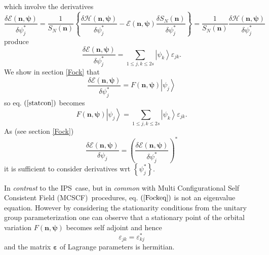 \documentclass[aps,preprint]{revtex4}%
\begin{document}
which involve the derivatives
\begin{equation}
\frac{\delta\mathcal{E}\left(  \mathbf{n,\psi}\right)  }{\delta\psi_{j}^{\ast
}}=\frac{1}{S_{N}\left(  \mathbf{n}\right)  }\left\{  \frac{\delta
\mathcal{H}\left(  \mathbf{n,\psi}\right)  }{\delta\psi_{j}^{\ast}%
}-\mathcal{E}\left(  \mathbf{n,\psi}\right)  \frac{\delta S_{N}\left(
\mathbf{n}\right)  }{\delta\psi_{j}^{\ast}}\right\}  =\frac{1}{S_{N}\left(
\mathbf{n}\right)  }\frac{\delta\mathcal{H}\left(  \mathbf{n,\psi}\right)
}{\delta\psi_{j}^{\ast}}%
\end{equation}
produce
\begin{equation}
\frac{\delta\mathcal{E}\left(  \mathbf{n,\psi}\right)  }{\delta\psi_{j}^{\ast
}}=\sum_{1\leq j,k\leq2s}\left\vert \psi_{k}\right\rangle \varepsilon_{jk}.
\label{statcon}%
\end{equation}
We show in section \ref{Fock} that
\begin{equation}
\frac{\delta\mathcal{E}\left(  \mathbf{n,\psi}\right)  }{\delta\psi_{j}^{\ast
}}=F\left(  \mathbf{n,\psi}\right)  \left\vert \psi_{j}\right\rangle
\end{equation}
so eq. $\left(  \ref{statcon}\right)  $ becomes
\begin{equation}
F\left(  \mathbf{n,\psi}\right)  \left\vert \psi_{j}\right\rangle =\sum_{1\leq
j,k\leq2s}\left\vert \psi_{k}\right\rangle \varepsilon_{jk}. \label{Fockeq}%
\end{equation}
As (see section \ref{Fock})%
\begin{equation}
\frac{\delta\mathcal{E}\left(  \mathbf{n,\psi}\right)  }{\delta\psi_{j}%
}=\left(  \frac{\delta\mathcal{E}\left(  \mathbf{n,\psi}\right)  }{\delta
\psi_{j}^{\ast}}\right)  ^{\ast}%
\end{equation}
it is sufficient to consider derivatives wrt $\left\{  \psi_{j}^{\ast
}\right\}  $.

In \emph{contrast} to the IPS\ case, but in \emph{common} with Multi
Configurational Self Consistent Field (MCSCF)\ procedures, eq. $\left(
\ref{Fockeq}\right)  $ is not an eigenvalue equation. However by considering
the stationarity conditions from the unitary group parameterization one can
observe that a stationary point of the orbital variation $F\left(
\mathbf{n,\psi}\right)  $ becomes self adjoint and hence
\begin{equation}
\varepsilon_{jk}=\varepsilon_{kj}^{\ast}%
\end{equation}
and the matrix $\mathbf{\varepsilon}$ of Lagrange parameters is hermitian.
\end{document}
